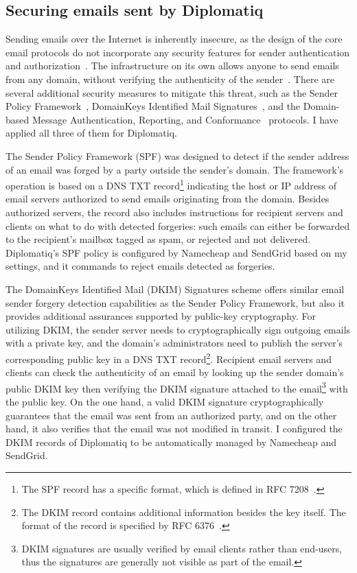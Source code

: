 \subsection{Securing emails sent by Diplomatiq}

Sending emails over the Internet is inherently insecure, as the design of the core email protocols do not incorporate any security features for sender authentication and authorization~\cite{foster2015security}. The infrastructure on its own allows anyone to send emails from any domain, without verifying the authenticity of the sender~\cite{rfc5321}. There are several additional security measures to mitigate this threat, such as the Sender Policy Framework~\cite{rfc7208}, DomainKeys Identified Mail Signatures~\cite{rfc6376}, and the Domain-based Message Authentication, Reporting, and Conformance~\cite{rfc7489} protocols. I have applied all three of them for Diplomatiq.

The Sender Policy Framework (SPF) was designed to detect if the sender address of an email was forged by a party outside the sender's domain. The framework's operation is based on a DNS TXT record\footnote{The SPF record has a specific format, which is defined in RFC 7208~\cite{rfc7208}.} indicating the host or IP address of email servers authorized to send emails originating from the domain. Besides authorized servers, the record also includes instructions for recipient servers and clients on what to do with detected forgeries: such emails can either be forwarded to the recipient's mailbox tagged as spam, or rejected and not delivered. Diplomatiq's SPF policy is configured by Namecheap and SendGrid based on my settings, and it commands to reject emails detected as forgeries.

The DomainKeys Identified Mail (DKIM) Signatures scheme offers similar email sender forgery detection capabilities as the Sender Policy Framework, but also it provides additional assurances supported by public-key cryptography. For utilizing DKIM, the sender server needs to cryptographically sign outgoing emails with a private key, and the domain's administrators need to publish the server's corresponding public key in a DNS TXT record\footnote{The DKIM record contains additional information besides the key itself. The format of the record is specified by RFC 6376~\cite{rfc6376}.}. Recipient email servers and clients can check the authenticity of an email by looking up the sender domain's public DKIM key then verifying the DKIM signature attached to the email\footnote{DKIM signatures are usually verified by email clients rather than end-users, thus the signatures are generally not visible as part of the email.} with the public key. On the one hand, a valid DKIM signature cryptographically guarantees that the email was sent from an authorized party, and on the other hand, it also verifies that the email was not modified in transit. I configured the DKIM records of Diplomatiq to be automatically managed by Namecheap and SendGrid.

